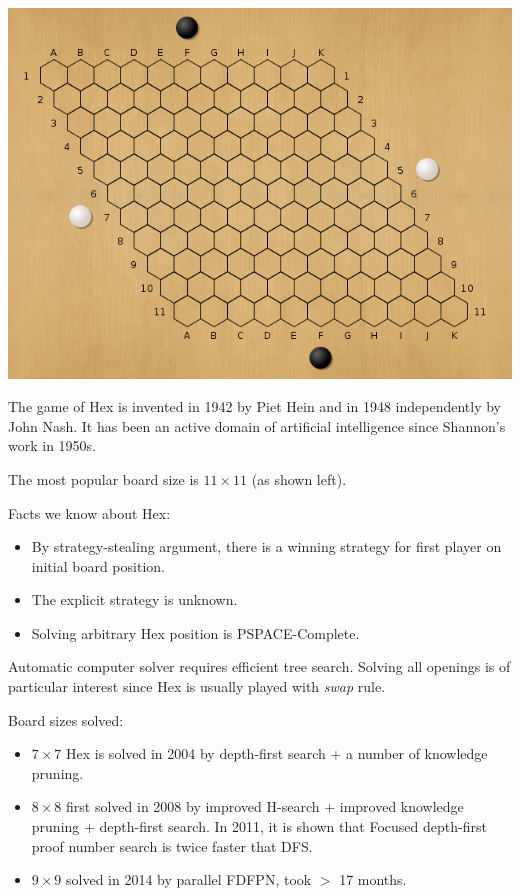 \documentclass[a0,portrait]{a0poster}
\begin{document}
\begin{multicols}{3}
\begin{minipage}{0.5\linewidth}
\includegraphics[scale=0.5]{hexboard.png} \\
\end{minipage}
\begin{minipage}{0.5\linewidth}
The game of Hex is invented in 1942 by Piet Hein and in 1948 independently by John Nash. It has been an active domain of artificial intelligence since Shannon's work in 1950s.

The most popular board size is $11\times 11$ (as shown left).
\end{minipage}
Facts we know about Hex:
\begin{itemize}
\item By strategy-stealing argument, there is a winning strategy for first player on initial board position.
\item The explicit strategy is unknown.
\item Solving arbitrary Hex position is PSPACE-Complete.
\end{itemize}

Automatic computer solver requires efficient tree search. 
Solving all openings is of particular interest since Hex is usually played with \emph{swap} rule.

Board sizes solved:
\begin{itemize}
\item $7\times 7$ Hex is solved in 2004 by depth-first search + a number of knowledge pruning. 
\item $8 \times 8$ first solved in 2008 by improved H-search + improved knowledge pruning + depth-first search. In 2011, it is shown that Focused depth-first proof number search is twice faster that DFS.
\item $9 \times 9$ solved in 2014 by parallel FDFPN, took $>$ 17 months. 
\end{itemize}


\end{multicols}
\end{document}
